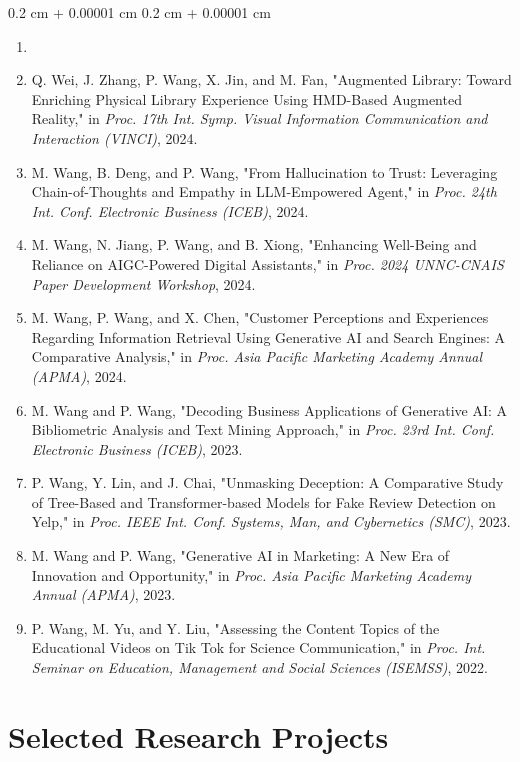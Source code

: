 \documentclass[10pt, letterpaper]{article}
\newenvironment{onecolentry}{
    \begin{adjustwidth}{
        0.2 cm + 0.00001 cm
    }{
        0.2 cm + 0.00001 cm
    }
}{
    \end{adjustwidth}
} %
\begin{document}
        \begin{onecolentry}
            \begin{enumerate}
                \item 
                \item Q. Wei, J. Zhang, P. Wang, X. Jin, and M. Fan, "Augmented Library: Toward Enriching Physical Library Experience Using HMD-Based Augmented Reality," in \textit{Proc. 17th Int. Symp. Visual Information Communication and Interaction (VINCI)}, 2024.
                \item M. Wang, B. Deng, and P. Wang, "From Hallucination to Trust: Leveraging Chain-of-Thoughts and Empathy in LLM-Empowered Agent," in \textit{Proc. 24th Int. Conf. Electronic Business (ICEB)}, 2024.
                \item M. Wang, N. Jiang, P. Wang, and B. Xiong, "Enhancing Well-Being and Reliance on AIGC-Powered Digital Assistants," in \textit{Proc. 2024 UNNC-CNAIS Paper Development Workshop}, 2024.
                \item M. Wang, P. Wang, and X. Chen, "Customer Perceptions and Experiences Regarding Information Retrieval Using Generative AI and Search Engines: A Comparative Analysis," in \textit{Proc. Asia Pacific Marketing Academy Annual (APMA)}, 2024.
                \item M. Wang and P. Wang, "Decoding Business Applications of Generative AI: A Bibliometric Analysis and Text Mining Approach," in \textit{Proc. 23rd Int. Conf. Electronic Business (ICEB)}, 2023.
                \item P. Wang, Y. Lin, and J. Chai, "Unmasking Deception: A Comparative Study of Tree-Based and Transformer-based Models for Fake Review Detection on Yelp," in \textit{Proc. IEEE Int. Conf. Systems, Man, and Cybernetics (SMC)}, 2023.
                \item M. Wang and P. Wang, "Generative AI in Marketing: A New Era of Innovation and Opportunity," in \textit{Proc. Asia Pacific Marketing Academy Annual (APMA)}, 2023.
                \item P. Wang, M. Yu, and Y. Liu, "Assessing the Content Topics of the Educational Videos on Tik Tok for Science Communication," in \textit{Proc. Int. Seminar on Education, Management and Social Sciences (ISEMSS)}, 2022.
            \end{enumerate}
        \end{onecolentry}

    \section{Selected Research Projects}
\end{document}
